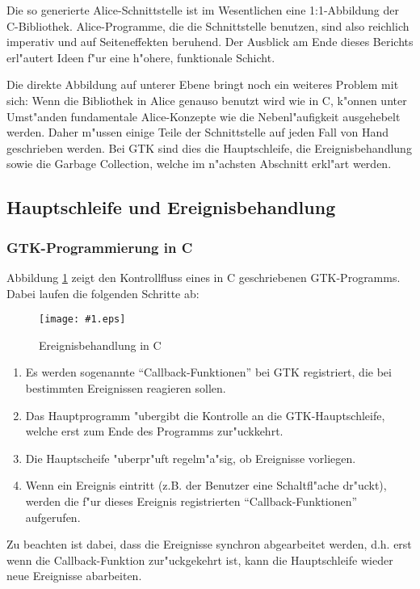 \documentclass[a4paper,titlepage]{article}
\newcommand{\showimage}[1]{\begin{center}\texttt{[image: \#1.eps]}\end{center}}
\begin{document}
Die so generierte Alice-Schnittstelle ist im Wesentlichen
eine 1:1-Abbildung der C-Biblio\-thek. Alice-Programme, die die Schnittstelle
benutzen, sind also reichlich imperativ und auf Seiteneffekten beruhend.
Der Ausblick am Ende dieses Berichts erl"autert Ideen f"ur eine h"ohere,
funktionale Schicht.

Die direkte Abbildung auf unterer Ebene bringt noch ein weiteres Problem
mit sich: Wenn die Bibliothek in Alice genauso benutzt wird wie in C, 
k"onnen unter Umst"anden fundamentale Alice-Konzepte wie die Nebenl"aufigkeit
ausgehebelt werden. Daher m"ussen einige Teile der
Schnittstelle auf jeden Fall von Hand geschrieben werden.
Bei GTK sind dies die Hauptschleife, die Ereignisbehandlung sowie die
Garbage Collection, welche im n"achsten Abschnitt erkl"art werden.

\subsection{Hauptschleife und Ereignisbehandlung}

\subsubsection*{GTK-Programmierung in C}

Abbildung \ref{EventsC} zeigt den Kontrollfluss eines in C
geschriebenen GTK-Programms. Dabei laufen die folgenden Schritte ab:
\begin{figure}
\showimage{events-c}
\caption{Ereignisbehandlung in C}
\label{EventsC}
\end{figure}

\begin{enumerate}
\item Es werden sogenannte ``Callback-Funktionen'' bei GTK registriert, die
      bei bestimmten Ereignissen reagieren sollen.
\item Das Hauptprogramm "ubergibt die Kontrolle an die GTK-Hauptschleife,
      welche erst zum Ende des Programms zur"uckkehrt.
\item Die Hauptscheife "uberpr"uft regelm"a"sig, ob Ereignisse vorliegen.
\item Wenn ein Ereignis eintritt (z.B. der Benutzer eine Schaltfl"ache 
      dr"uckt), werden die f"ur dieses Ereignis registrierten
      ``Callback-Funktionen'' aufgerufen.
\end{enumerate}

Zu beachten ist dabei, dass die Ereignisse synchron abgearbeitet werden,
d.h. erst wenn die Callback-Funktion zur"uckgekehrt ist, kann die Hauptschleife
wieder neue Ereignisse abarbeiten.
\end{document}
